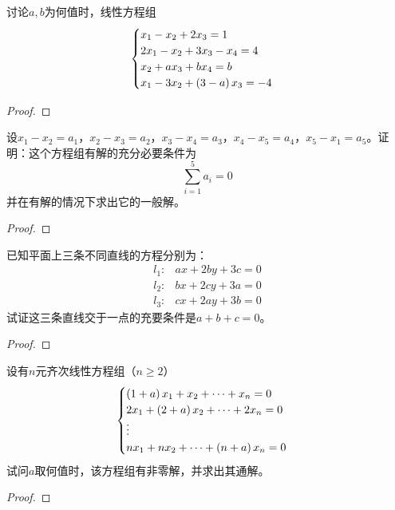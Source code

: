 \begin{problem}
讨论\(a,b\)为何值时，线性方程组
\begin{equation*}
    \begin{cases}
        x_1-x_2+2x_3=1             \\
        2x_1-x_2+3x_3-x_4=4        \\
        x_2+ax_3+bx_4=b            \\
        x_1-3x_2+\left( 3-a \right)x_3=-4 \\
    \end{cases}
\end{equation*}
\end{problem}
\begin{proof}

\end{proof}

\begin{problem}
设\(x_1-x_2=a_1\)，\(x_2-x_3=a_2\)，\(x_3-x_4=a_3\)，\(x_4-x_5=a_4\)，\(x_5-x_1=a_5\)。证明：这个方程组有解的充分必要条件为
\begin{equation*}
    \sum_{i=1}^5a_i=0
\end{equation*}
并在有解的情况下求出它的一般解。
\end{problem}
\begin{proof}

\end{proof}

\begin{problem}
已知平面上三条不同直线的方程分别为：
\begin{align*}
    l_1: & ax+2by+3c=0 \\
    l_2: & bx+2cy+3a=0 \\
    l_3: & cx+2ay+3b=0
\end{align*}
试证这三条直线交于一点的充要条件是\(a+b+c=0\)。
\end{problem}
\begin{proof}

\end{proof}

\begin{problem}
设有\(n\)元齐次线性方程组（\(n\ge2\)）
\begin{equation*}
    \begin{cases}
        \left( 1+a \right)x_1+x_2+\cdots+x_n=0   \\
        2x_1+\left( 2+a \right)x_2+\cdots+2x_n=0 \\
        \vdots                            \\
        nx_1+nx_2+\cdots+\left( n+a \right)x_n=0
    \end{cases}
\end{equation*}
试问\(a\)取何值时，该方程组有非零解，并求出其通解。
\end{problem}
\begin{proof}

\end{proof}

